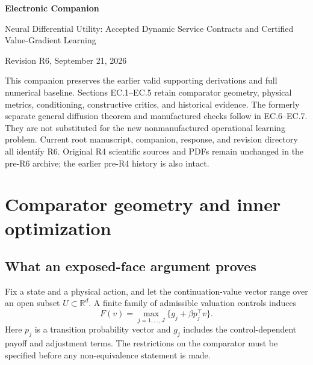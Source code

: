 \documentclass[11pt,letterpaper]{article}
\theoremstyle{definition}
\newcommand{\R}{\mathbb R}
\newcommand{\1}{\mathbf 1}
\begin{document}
\begin{center}
{\Large\bfseries Electronic Companion\par}
\medskip
{\large Neural Differential Utility: Accepted Dynamic Service Contracts and Certified Value-Gradient Learning\par}
\medskip
{Revision R6, September 21, 2026}
\end{center}
This companion preserves the earlier valid supporting derivations and full numerical baseline. Sections EC.1--EC.5 retain comparator geometry, physical metrics, conditioning, constructive critics, and historical evidence. The formerly separate general diffusion theorem and manufactured checks follow in EC.6--EC.7. They are not substituted for the new nonmanufactured operational learning problem. Current root manuscript, companion, response, and revision directory all identify R6. Original R4 scientific sources and PDFs remain unchanged in the pre-R6 archive; the earlier pre-R4 history is also intact.
\section{Comparator geometry and inner optimization}
\subsection{What an exposed-face argument proves}
Fix a state and a physical action, and let the continuation-value vector range over an open subset $U\subset\R^d$. A finite family of admissible valuation controls induces
\begin{equation}
 F(v)=\max_{j=1,\ldots,J}\{g_j+\beta p_j^\top v\}.
\end{equation}
Here $p_j$ is a transition probability vector and $g_j$ includes the control-dependent payoff and adjustment terms. The restrictions on the comparator must be specified before any non-equivalence statement is made.
\end{document}
